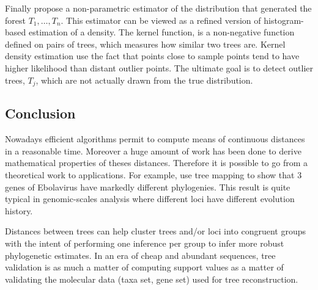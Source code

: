 Finally \citet{weyenberg2014kdetrees}  propose  a non-parametric estimator of the distribution that generated the forest $T_1,\ldots,T_n$.  This estimator can be viewed as a refined version of histogram-based estimation of a density. The kernel function, is a non-negative function defined on pairs of trees, which measures how similar two trees are. Kernel density estimation use the fact that points close to sample points tend to have higher likelihood than distant outlier points.  The ultimate goal is to detect outlier trees, $T_j$, which are not actually drawn from the true distribution.


%

\subsection{Conclusion}

Nowadays efficient algorithms permit to compute means of continuous distances in a reasonable time. Moreover a huge amount of work has been done to derive mathematical properties of theses distances. Therefore it is possible to go from a theoretical work to applications. For example, \citet{Kendall2016} use tree mapping to show that 3 genes of Ebolavirus have markedly different phylogenies. This result is quite typical in genomic-scales analysis where different loci have different evolution history. 

Distances between trees can help cluster trees and/or loci into congruent groups with the intent of performing one inference per group to infer more robust phylogenetic estimates. In an era of cheap and abundant sequences, tree validation is as much a matter of computing support values as a matter of validating the molecular data (taxa set, gene set) used for tree reconstruction. 